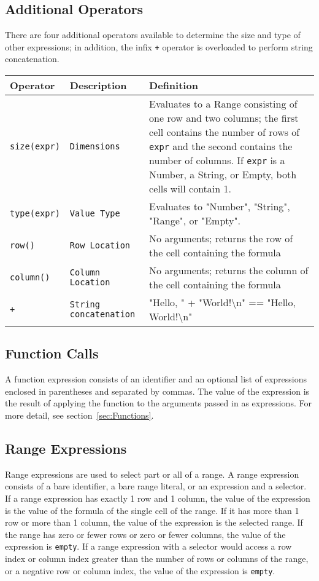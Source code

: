\subsection {Additional Operators}
There are four additional operators available to determine the size and type of other expressions; in addition, the infix \texttt{+} operator is overloaded to perform string concatenation.
\begin{table}[H]
\begin{tabular}{ |p{2cm}|p{3cm}|p{8cm}|  }
\hline
\textbf{Operator} & \textbf{Description} & \textbf{Definition} \\ \hline
\texttt{size(expr)} & \texttt{Dimensions} & {Evaluates to a Range consisting of one row and two columns; the first cell contains the number of rows of \texttt{expr} and the second contains the number of columns. If \texttt{expr} is a Number, a String, or Empty, both cells will contain 1.} \\ \hline
\texttt{type(expr)} & \texttt{Value Type} & {Evaluates to "Number", "String", "Range", or "Empty".} \\ \hline
\texttt{row()} & \texttt{Row Location} & {No arguments; returns the row of the cell containing the formula} \\ \hline
\texttt{column()} & \texttt{Column Location} & {No arguments; returns the column of the cell containing the formula} \\ \hline
\texttt{+} & \texttt{String concatenation} & {"Hello, " + "World!\textbackslash n" == "Hello, World!\textbackslash n"}\\ \hline
\end{tabular}
\end{table}

\subsection {Function Calls}
A function expression consists of an identifier and an optional list of expressions enclosed in parentheses and separated by commas. The value of the expression is the result of applying the function to the arguments passed in as expressions. For more detail, see section~\ref{sec:Functions}.
\subsection{Range Expressions}
Range expressions are used to select part or all of a range. A range expression consists of a bare identifier, a bare range literal, or an expression and a selector. If a range expression has exactly 1 row and 1 column, the value of the expression is the value of the formula of the single cell of the range. If it has more than 1 row or more than 1 column, the value of the expression is the selected range. If the range has zero or fewer rows or zero or fewer columns, the value of the expression is \texttt{empty}. If a range expression with a selector would access a row index or column index greater than the number of rows or columns of the range, or a negative row or column index, the value of the expression is \texttt{empty}.
